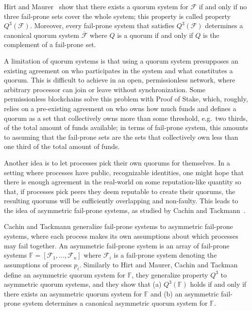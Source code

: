 \documentclass[11pt]{article}
\begin{document}
Hirt and Maurer~\cite{hirtPlayerSimulationGeneral2000} show that there exists a quorum system for $\mathcal{F}$ if and only if no three fail-prone sets cover the whole system; this property is called property $Q^3(\mathcal{F})$. Moreover, every fail-prone system that satisfies $Q^3(\mathcal{F})$ determines a canonical quorum system $\overline{\mathcal{F}}$ where $Q$ is a quorum if and only if $Q$ is the complement of a fail-prone set. %

A limitation of quorum systems is that using a quorum system presupposes an existing agreement on who participates in the system and what constitutes a quorum.
This is difficult to achieve in an open, permissionless network, where arbitrary processor can join or leave without synchronization.
Some permissionless blockchains solve this problem with Proof of Stake, which, roughly, relies on a pre-existing agreement on who owns how much funds and defines a quorum as a set that collectively owns more than some threshold, e.g.\ two thirds, of the total amount of funds available; in terms of fail-prone system, this amounts to assuming that the fail-prone sets are the sets that collectively own less than one third of the total amount of funds.

Another idea is to let processes pick their own quorums for themselves. In a setting where processes have public, recognizable identities, one might hope that there is enough agreement in the real-world on some reputation-like quantity so that, if processes pick peers they deem reputable to create their quorums, the resulting quorums will be sufficiently overlapping and non-faulty. This leads to the idea of asymmetric fail-prone systems, as studied by Cachin and Tackmann~\cite{cachinAsymmetricDistributedTrust2019}.

Cachin and Tackmann generalize fail-prone systems to asymmetric fail-prone systems, where each process makes its own assumptions about which processes may fail together.
An asymmetric fail-prone system is an array of fail-prone systems $\mathbb{F}=\left[\mathcal{F}_1,...,\mathcal{F}_n\right]$ where $\mathcal{F}_i$ is a fail-prone system denoting the assumptions of process $p_i$.  Similarly to Hirt and Maurer, Cachin and Tackman define an asymmetric quorum system for $\mathbb{F}$, they generalize property $Q^3$ to asymmetric quorum systems, and they show that (a) $Q^3(\mathbb{F})$ holds if and only if there exists an asymmetric quorum system for $\mathbb{F}$ and (b) an asymmetric fail-prone system determines a canonical asymmetric quorum system for $\mathbb{F}$.
\end{document}
